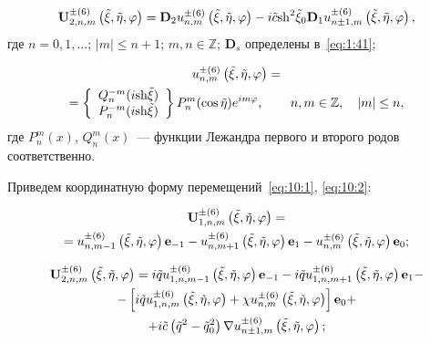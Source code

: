 \begin{russian}
\begin{equation}
{\bf{U}}_{2,n,m}^{ \pm (6)}\left( {\tilde \xi ,\tilde \eta ,\varphi } \right) = {{\bf{D}}_2}u_{n,m}^{ \pm (6)}\left( {\tilde \xi ,\tilde \eta ,\varphi } \right) - i\tilde c{{\mathop{\rm sh}\nolimits} ^2}{\tilde \xi _0}{{\bf{D}}_1}u_{n \pm 1,m}^{ \pm (6)}\left( {\tilde \xi ,\tilde \eta ,\varphi } \right),
\label{eq:10:2}
\end{equation}
где $n=0,1,\dots$; $|m|\le n+1$; $m,n\in\mathbb{Z}$; $\mathbf{D}_s$ определены в~\eqref{eq:1:41};

\begin{multline}
u_{n,m}^{ \pm (6)}\left( {\tilde \xi ,\tilde \eta ,\varphi } \right) = \\
= \left\{ \begin{array}{l}
Q_n^{ - m}(i{\mathop{\rm sh}\nolimits} \tilde \xi )\\
P_n^{ - m}(i{\mathop{\rm sh}\nolimits} \tilde \xi )
\end{array} \right\}P_n^m(\cos \tilde \eta ){e^{im\varphi }},\qquad {\kern 1pt} n,m \in\mathbb{Z} ,\quad |m| \le n,
\end{multline}
где $P_n^m(x)$, $Q_n^m(x)$~--- функции Лежандра первого и второго родов соответственно.

Приведем координатную форму перемещений~\eqref{eq:10:1}, \eqref{eq:10:2}:

\begin{multline}
{\bf{U}}_{1,n,m}^{ \pm (6)}\left( {\tilde \xi ,\tilde \eta ,\varphi } \right) = \\
= u_{n,m - 1}^{ \pm (6)}\left( {\tilde \xi ,\tilde \eta ,\varphi } \right){{\bf{e}}_{ - 1}} - u_{n,m + 1}^{ \pm (6)}\left( {\tilde \xi ,\tilde \eta ,\varphi } \right){{\bf{e}}_1} - u_{n,m}^{ \pm (6)}\left( {\tilde \xi ,\tilde \eta ,\varphi } \right){{\bf{e}}_0};
\end{multline}

\begin{multline}
{\bf{U}}_{2,n,m}^{ \pm (6)}\left( {\tilde \xi ,\tilde \eta ,\varphi } \right) = i\tilde qu_{1,n,m - 1}^{ \pm (6)}\left( {\tilde \xi ,\tilde \eta ,\varphi } \right){{\bf{e}}_{ - 1}} - i\tilde qu_{1,n,m + 1}^{ \pm (6)}\left( {\tilde \xi ,\tilde \eta ,\varphi } \right){{\bf{e}}_1} - \\
- \left[ {i\tilde qu_{1,n,m}^{ \pm (6)}\left( {\tilde \xi ,\tilde \eta ,\varphi } \right) + \chi u_{n,m}^{ \pm (6)}\left( {\tilde \xi ,\tilde \eta ,\varphi } \right)} \right]{{\bf{e}}_0} + \\
+ i\tilde c\left( {{{\tilde q}^2} - \tilde q_0^2} \right)\nabla u_{n \pm 1,m}^{ \pm (6)}\left( {\tilde \xi ,\tilde \eta ,\varphi } \right);
\end{multline}


\end{russian}
